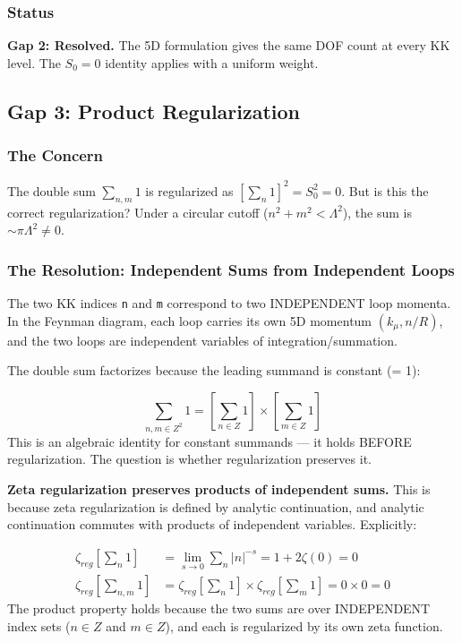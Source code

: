 \documentclass[aps,prd,preprint,superscriptaddress,longbibliography,floatfix]{revtex4-2}
\theoremstyle{remark}
\begin{document}
\subsubsection{Status}

\textbf{Gap 2: Resolved.} The 5D formulation gives the same DOF count at every KK level. The $S_{0} = 0$ identity applies with a uniform weight.



\subsection{Gap 3: Product Regularization}


\subsubsection{The Concern}

The double sum $\sum_{n,m} 1$ is regularized as $[\sum_n 1]^{2} = S_{0}^{2} = 0$. But is this the correct regularization? Under a circular cutoff ($n^{2} + m^{2} < \Lambda^{2}$), the sum is $\sim \pi\Lambda^{2} \neq 0$.


\subsubsection{The Resolution: Independent Sums from Independent Loops}

The two KK indices \texttt{n} and \texttt{m} correspond to two INDEPENDENT loop momenta. In the Feynman diagram, each loop carries its own 5D momentum $(k_\mu, n/R)$, and the two loops are independent variables of integration/summation.

The double sum factorizes because the leading summand is constant (= 1):


\begin{equation}
    \sum_{n,m \in Z^{2}} 1 = [\sum_{n \in Z} 1] \times [\sum_{m \in Z} 1]
\end{equation}
This is an algebraic identity for constant summands --- it holds BEFORE regularization. The question is whether regularization preserves it.

\textbf{Zeta regularization preserves products of independent sums.} This is because zeta regularization is defined by analytic continuation, and analytic continuation commutes with products of independent variables. Explicitly:


\begin{align}
    \zeta_{reg}[\sum_n 1] &= \lim_{s\to0} \sum_n |n|^{-s} = 1 + 2\zeta(0) = 0 \\
    \zeta_{reg}[\sum_{n,m} 1] &= \zeta_{reg}[\sum_n 1] \times \zeta_{reg}[\sum_m 1] = 0 \times 0 = 0
\end{align}
The product property holds because the two sums are over INDEPENDENT index sets ($n \in Z$ and $m \in Z$), and each is regularized by its own zeta function.
\end{document}
